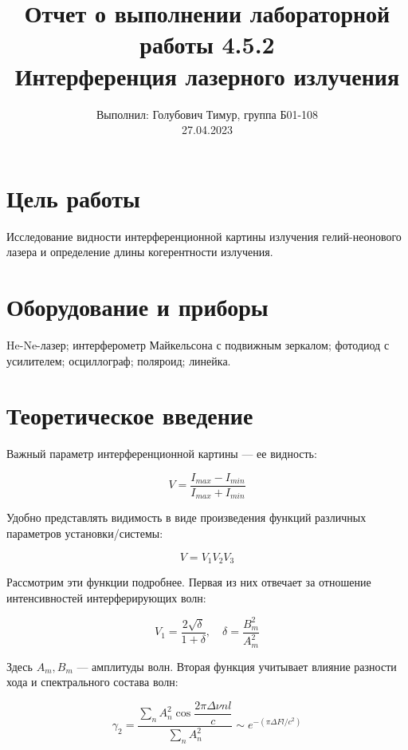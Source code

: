 \documentclass[12pt,a4paper]{article}
\author{\normalsize Выполнил: Голубович Тимур, группа Б01-108 \\
    	\normalsize 27.04.2023}
\date{}
\title{
    	\large Отчет о выполнении лабораторной работы 4.5.2 \\
    	\Large Интерференция лазерного излучения
     }
\begin{document}
    	\maketitle
    	
    \section*{Цель работы}
    Исследование видности интерференционной картины излучения гелий-неонового лазера и определение длины когерентности излучения.
    
    \section*{Оборудование и приборы} 
    He-Ne-лазер; интерферометр Майкельсона с подвижным зеркалом; фотодиод с усилителем; осциллограф; поляроид; линейка.

	
\section*{Теоретическое введение}

	Важный параметр интерференционной картины --- ее видность:

    \begin{equation}\label{V0}
    V = \dfrac{I_{max} - I_{min}}{I_{max} + I_{min}}
    \end{equation}
    
    Удобно представлять видимость в виде произведения функций различных параметров установки/системы:
    
    \begin{equation}\label{VVV}
    V = V_1 V_2 V_3
    \end{equation}
    
    Рассмотрим эти функции подробнее. Первая из них отвечает за отношение интенсивностей интерферирующих волн:
    
    \begin{equation}\label{V1}
    V_1 = \dfrac{2\sqrt{\delta}}{1 + \delta}, \quad \delta = \dfrac{B_m^2}{A_m^2}
    \end{equation}
    
    
    Здесь $ A_m, B_m $ --- амплитуды волн. Вторая функция учитывает влияние разности хода и спектрального состава волн:
    
    
    \begin{equation}\label{}
    \gamma_2 = \dfrac{\sum\limits_n A_n^2 \cos{\dfrac{2\pi \Delta \nu n l}{c}}}{\sum\limits_n A_n^2} \sim e^{-(\pi \Delta F l /c^2)}
    \end{equation}
    
\end{document}
